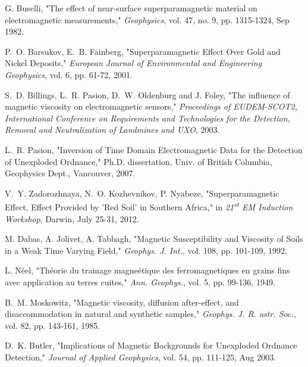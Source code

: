 \documentclass[journal]{IEEEtran}  %
\begin{document}
\begin{thebibliography}{100}

G. Buselli, "The effect of near-surface superparamagnetic material on electromagnetic measurements," \emph{Geophysics}, vol. 47, no. 9, pp. 1315-1324, Sep 1982.

P.~O. Barsukov, E.~B. Fainberg, "Superparamagnetic Effect Over Gold and Nickel Deposits," \emph{European Journal of Environmental and Engineering Geophysics}, vol. 6, pp. 61-72, 2001.

S.~D. Billings, L.~R. Pasion, D.~W. Oldenburg and J. Foley, "The influence of magnetic viscosity on electromagnetic sensors," \emph{Proceedings of EUDEM-SCOT2, International Conference on Requirements and Technologies for the Detection, Removal and Neutralization of Landmines and UXO}, 2003.

L.~R. Pasion, "Inversion of Time Domain Electromagnetic Data for the Detection of Unexploded Ordnance," Ph.D. dissertation, Univ. of British Columbia, Geophysics Dept., Vancouver, 2007.

V.~Y. Zadorozhnaya, N.~O. Kozhevnikov, P. Nyabeze, "Superparamagnetic Effect, Effect Provided by 'Red Soil' in Southern Africa," in \emph{21\textsuperscript{st} EM Induction Workshop}, Darwin, July 25-31, 2012.

M. Dabas, A. Jolivet, A. Tabbagh, "Magnetic Susceptibility and Viscosity of Soils in a Weak Time Varying Field," \emph{Geophys. J. Int.}, vol. 108, pp. 101-109, 1992.

L. N\'{e}el, "Th\'{e}orie du trainage magne\'{e}tique des ferromagnetiques en grains fins avec application au terres cuites," \emph{Ann. Geophys.}, vol. 5, pp. 99-136, 1949.

B.~M. Moskowitz, "Magnetic viscosity, diffusion after-effect, and disaccommodation in natural and synthetic samples," \emph{Geophys. J. R. astr. Soc.}, vol. 82, pp. 143-161, 1985.

D.~K. Butler, "Implications of Magnetic Backgrounds for Unexploded Ordnance Detection," \emph{Journal of Applied Geophysics}, vol. 54, pp. 111-125, Aug 2003.



\end{thebibliography}
\end{document}
